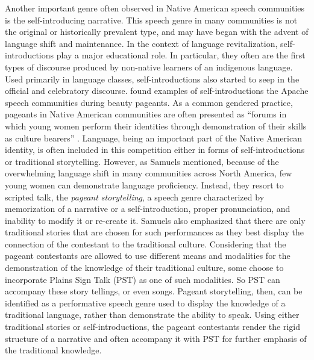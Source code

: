 \documentclass[12pt, draft]{article}
\begin{document}
Another important genre often observed in Native American speech communities is the self-introducing narrative. This speech genre in many communities is not the original or historically prevalent type, and may have began with the advent of language shift and maintenance. In the context of language revitalization, self-introductions play a major educational role. In particular, they often are the first types of discourse produced by non-native learners of an indigenous language. Used primarily in language classes, self-introductions also started to seep in the official and celebratory discourse. \textcite{samuels2004} found examples of self-introductions the Apache speech communities during beauty pageants. As a common gendered practice, pageants in Native American communities are often presented as ``forums in which young women perform their identities through demonstration of their skills as culture bearers'' \parencite[p. 177]{samuels2004}. Language, being an important part of the Native American identity, is often included in this competition either in forms of self-introductions or traditional storytelling. However, as Samuels mentioned, because of the overwhelming language shift in many communities across North America, few young women can demonstrate language proficiency. Instead, they resort to scripted talk, the \textit{pageant storytelling}, a speech genre characterized by memorization of a narrative or a self-introduction, proper pronunciation, and inability to modify it or re-create it. Samuels also emphasized that there are only traditional stories that are chosen for such performances as they best display the connection of the contestant to the traditional culture. Considering that the pageant contestants are allowed to use different means and modalities for the demonstration of the knowledge of their traditional culture, some choose to incorporate Plains Sign Talk (PST) as one of such modalities. So PST can accompany these story tellings, or even songs. Pageant storytelling, then, can be identified as a performative speech genre used to display the knowledge of a traditional language, rather than demonstrate the ability to speak. Using either traditional stories or self-introductions, the pageant contestants render the rigid structure of a narrative and often accompany it with PST for further emphasis of the traditional knowledge.
\end{document}

